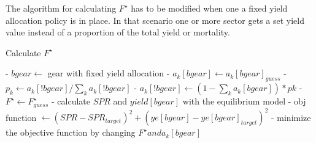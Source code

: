 \documentclass[12pt,letterpaper]{article}
\begin{document}
The algorithm for calculating $F^{\star}$ has to be modified when one a fixed yield allocation policy is in place. In that scenario one or more sector gets a set yield value instead of a proportion of the total yield or mortality.


\begin{algorithm} 
\large
\caption{Calculate $F^{\star}$}
\begin{algorithmic}
 - $bgear \leftarrow $ gear with fixed yield allocation 
 - $a_k[bgear] \leftarrow {a_k[bgear]}_{guess}$ 
 - $p_k \leftarrow a_k[!bgear]/\sum_k a_k[!bgear]$ 
 - $a_k[!bgear] \leftarrow (1-\sum_k a_k[bgear])* pk$
 - $F^{\star} \leftarrow F^{\star}_{guess}$
 - calculate $SPR$ and $yield[bgear]$ with the equilibrium model
 - obj function $\leftarrow (SPR-SPR_{target})^2 + (ye[bgear]-{ye[bgear]}_{target})^2$
 - minimize the objective function by changing $F^{\star} and a_k[bgear] $
\end{algorithmic}
\end{algorithm}   
\end{document}
